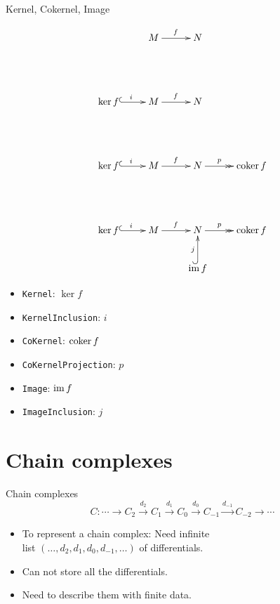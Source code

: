 \begin{frame}{Kernel, Cokernel, Image}
\begin{overprint}
\[
\xymatrix{
{\phantom{\ker f}} &
M \ar[r]^f &
N &
{\phantom{\coker f}} \\
&& {\phantom{\im f}}
}
\]
\[
\xymatrix{
\ker f \ar@{^{(}->}[r]^i &
M \ar[r]^f &
N &
{\phantom{\coker f}} \\
&& {\phantom{\im f}}
}
\]
\[
\xymatrix{
\ker f \ar@{^{(}->}[r]^i &
M \ar[r]^f &
N \ar@{->>}[r]^-p &
\coker f \\
&& {\phantom{\im f}}
}
\]
\[
\xymatrix{
\ker f \ar@{^{(}->}[r]^i &
M \ar[r]^f &
N \ar@{->>}[r]^-p &
\coker f \\
&& \im f \ar@{^{(}->}[u]^j
}
\]
\end{overprint}
\begin{itemize}
\item \texttt{Kernel}: $\ker f$
\item \texttt{KernelInclusion}: $i$
\item \texttt{CoKernel}: $\operatorname{coker} f$
\item \texttt{CoKernelProjection}: $p$
\item \texttt{Image}: $\operatorname{im} f$
\item \texttt{ImageInclusion}: $j$
\end{itemize}
\end{frame}

\section{Chain complexes}

\begin{frame}{Chain complexes}
\[
C \colon \cdots \to
 C_2 \xrightarrow{d_2}
 C_1 \xrightarrow{d_1}
 C_0 \xrightarrow{d_0}
 C_{-1} \xrightarrow{d_{-1}}
 C_{-2} \to \cdots
\]
\begin{itemize}
\pause
\item To represent a chain complex: Need infinite\\
list $(\ldots, d_2, d_1, d_0, d_{-1}, \ldots)$ of differentials.
\pause
\item Can not store all the differentials.
\pause
\item Need to describe them with finite data.
\end{itemize}
\end{frame}

